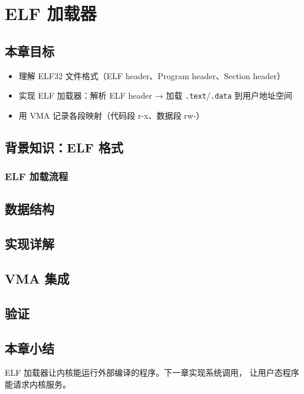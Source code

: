 \chapter{ELF 加载器}
\label{ch:elf-loader}

\section{本章目标}

\begin{itemize}
  \item 理解 ELF32 文件格式（ELF header、Program header、Section header）
  \item 实现 ELF 加载器：解析 ELF header → 加载 \texttt{.text}/\texttt{.data} 到用户地址空间
  \item 用 VMA 记录各段映射（代码段 r-x、数据段 rw-）
\end{itemize}

\section{背景知识：ELF 格式}


\subsection{ELF 加载流程}


\section{数据结构}


\section{实现详解}


\section{VMA 集成}


\section{验证}


\section{本章小结}

ELF 加载器让内核能运行外部编译的程序。下一章实现系统调用，
让用户态程序能请求内核服务。
